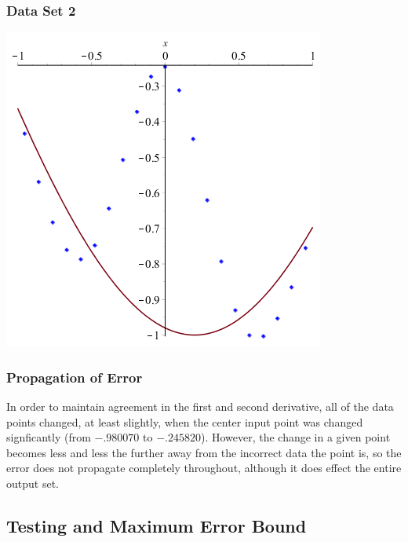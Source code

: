 \documentclass[11pt]{article} %
\begin{document}
\subsubsection*{Data Set 2}
\includegraphics[scale=.5]{plots/dataset2approx.png}
\subsubsection*{Propagation of Error}
In order to maintain agreement in the first and second derivative, all of the data points changed, at least
slightly, when the center input point was changed signficantly (from $-.980070 $ to $-.245820$). However, the change in a 
given point becomes less and less the further away from the incorrect data the point is, so the error does not propagate
completely throughout, although it does effect the entire output set.

\subsection*{Testing and Maximum Error Bound}
\end{document}

